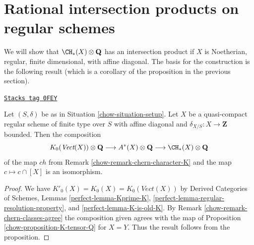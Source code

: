 \section{Rational intersection products on regular schemes}
\label{chow-section-intersection-regular}
We will show that $\CH_*(X) \otimes \mathbf{Q}$ has an intersection
product if $X$ is Noetherian, regular, finite dimensional, with
affine diagonal. The basis for the construction is the following result
(which is a corollary of the proposition in the previous section).

\begin{lemma}[K tensor Q]
\label{chow-lemma-K-tensor-Q}
\href{https://stacks.math.columbia.edu/tag/0FEY}{\texttt{Stacks tag 0FEY}}

Let $(S, \delta)$ be as in Situation \ref{chow-situation-setup}.
Let $X$ be a quasi-compact regular scheme of finite type over $S$ with
affine diagonal and $\delta_{X/S} : X \to \mathbf{Z}$ bounded.
Then the composition
$$
K_0(\textit{Vect}(X)) \otimes \mathbf{Q}
\longrightarrow
A^*(X) \otimes \mathbf{Q}
\longrightarrow
\CH_*(X) \otimes \mathbf{Q}
$$
of the map $ch$ from Remark \ref{chow-remark-chern-character-K} and
the map $c \mapsto c \cap [X]$ is an isomorphism.
\end{lemma}

\begin{proof}

We have $K'_0(X) = K_0(X) = K_0(\textit{Vect}(X))$ by
Derived Categories of Schemes, Lemmas \ref{perfect-lemma-Kprime-K},
\ref{perfect-lemma-regular-resolution-property}, and
\ref{perfect-lemma-K-is-old-K}.
By Remark \ref{chow-remark-chern-classes-agree}
the composition given agrees with the map of
Proposition \ref{chow-proposition-K-tensor-Q} for $X = Y$.
Thus the result follows from the proposition.
\end{proof}

